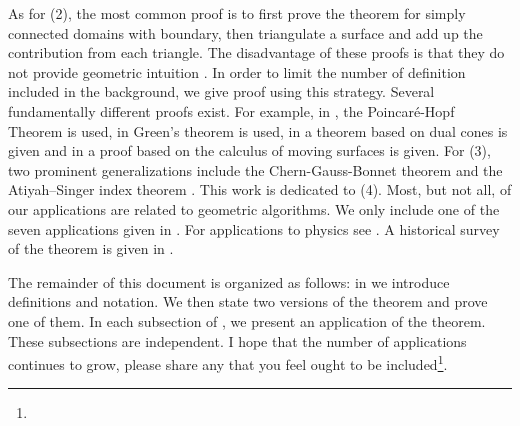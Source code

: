  
As for (2), the most common proof is to first prove the theorem for simply connected domains
with boundary, then triangulate a surface and add up the contribution from each triangle.
The disadvantage of these proofs is that they do not provide geometric intuition \cite{wu_historical_2008}.
In order to limit the number of definition included in the background,
we give proof using this strategy.
Several fundamentally different proofs exist.
For example, in \cite{guillemin_differential_2010}, 
the Poincar\'{e}-Hopf Theorem is used,
in \cite{doc76,pressley_elementary_2010} Green's theorem is used,
in \cite{levi-bicycle} a theorem based on dual cones is given
and in \cite{grinfeld_introduction_2013}
a proof based on the calculus of
moving surfaces is given.
For (3), two prominent generalizations include
the Chern-Gauss-Bonnet theorem \cite{chern_simple_1944} and the Atiyah–Singer index 
theorem \cite{atiyah_index_1963}.
This work is dedicated to (4).
Most, but not all, of our applications are related to geometric algorithms. 
We only include one of the seven applications given in \cite{doc76}.
For applications to physics see \cite{tirado-physics-apps,gibbons_applications_2008}.
A historical survey of the theorem is given in \cite{wu_historical_2008}.




The remainder of this document is organized as follows:
in  we introduce definitions and notation. 
We then state two versions of the theorem and prove one of them.
In each subsection of , we present an application of the theorem.
These subsections are independent.
I hope that the number of applications continues to grow,
please share any that you feel
ought to be included\footnote{}.


